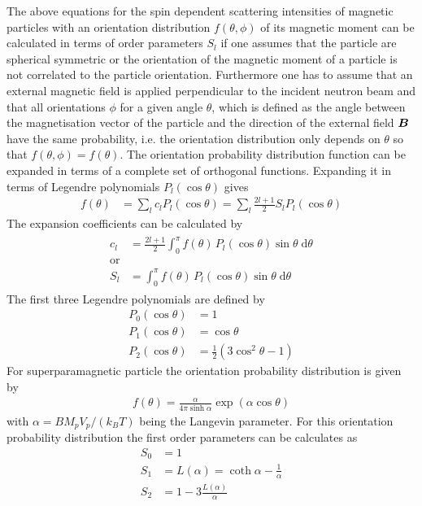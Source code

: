 The above equations for the spin dependent scattering intensities of
magnetic particles with an orientation distribution
$f\left(\theta,\phi\right)$ of its magnetic moment can be calculated
in terms of order parameters $S_l$ if one assumes that the particle
are spherical symmetric or the orientation of the magnetic moment of
a particle is not correlated to the particle orientation.
Furthermore one has to assume that an external magnetic field is
applied perpendicular to the incident neutron beam and that all
orientations $\phi$ for a given angle $\theta$, which is defined as
the angle between the magnetisation vector of the particle and the
direction of the external field $\mbox{\boldmath$B$}$ have the same probability,
i.e. the orientation distribution only depends on $\theta$ so that
$f\left(\theta,\phi\right)=f\left(\theta\right)$. The orientation
probability distribution function can be expanded in terms of a
complete set of orthogonal functions. Expanding it in terms of
Legendre polynomials $P_l(\cos\theta)$ gives
\begin{align}
f(\theta) &= \sum_l c_l P_l(\cos\theta) = \sum_l \frac{2l+1}{2} S_l
P_l(\cos\theta)
\end{align}
The expansion coefficients can be calculated by
\begin{align}
\begin{split}
c_l &= \frac{2l+1}{2} \int_0^\pi f(\theta)\, P_l(\cos\theta) \sin\theta \;\mathrm{d}\theta\\
\mbox{or} \\
S_l &= \int_0^\pi f(\theta) \, P_l(\cos\theta)
\sin\theta\;\mathrm{d}\theta
\end{split}
\end{align}
The first three Legendre polynomials are defined by
\begin{subequations}
\begin{align}
P_0(\cos\theta) &= 1\\
P_1(\cos\theta) &= \cos\theta\ \\
P_2(\cos\theta) &= \frac{1}{2}\left(3\cos^2\theta-1\right)
\end{align}
\end{subequations}
For superparamagnetic particle the orientation probability
distribution is given by
\begin{align}
f(\theta) = \frac{\alpha}{4\pi\sinh\alpha} \exp(\alpha\cos\theta)
\end{align}
with $\alpha=BM_pV_p/(k_BT)$ being the Langevin parameter. For this
orientation probability distribution the first order parameters can
be calculates as
\begin{subequations}
\label{eq:S_l_Boltzmann}
\begin{align}
S_0 & = 1 \\
S_1 & = L(\alpha) = \coth\alpha - \frac{1}{\alpha} \\
S_2 & = 1-3\frac{L(\alpha)}{\alpha}
\end{align}
\end{subequations}


